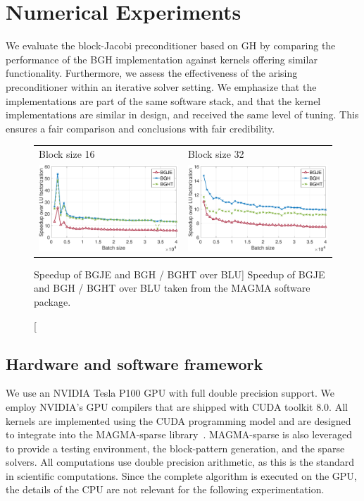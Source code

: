 \section{Numerical Experiments}
We evaluate the block-Jacobi preconditioner based on GH 
by comparing the performance of the BGH implementation 
against kernels offering similar functionality.
Furthermore, we assess the effectiveness of the arising preconditioner within an iterative solver setting.
We emphasize that the implementations are part of the same software stack,
and that the kernel implementations are similar in design, and received the same level of tuning. 
This ensures a fair comparison and conclusions with fair credibility. 

\begin{figure}[t]
\begin{center}
\begin{tabular}{ll}
Block size 16 & Block size 32\\
\includegraphics[width=.45\columnwidth]{plots/dgebjp_setup_P100_lu_gje_gh_16_speedup.pdf}
&
\includegraphics[width=.45\columnwidth]{plots/dgebjp_setup_P100_lu_gje_gh_32_speedup.pdf}
\end{tabular}
\end{center}
\caption
[Speedup of BGJE and BGH / BGHT over BLU]
{
Speedup of BGJE and BGH / BGHT over BLU taken from the MAGMA software package.
}
\label{2017-gh-block-jacobi:fig:bgjeperformance}
\end{figure}


\subsection{Hardware and software framework}
We use an NVIDIA Tesla P100 GPU with full double precision support.
We employ NVIDIA's GPU compilers that are shipped with CUDA toolkit 8.0. 
All kernels are implemented using the CUDA programming model and are designed to integrate into the MAGMA-sparse library~\cite{magma}.
MAGMA-sparse is also leveraged to provide a testing environment, the block-pattern generation, and the sparse solvers.
All computations use double precision arithmetic, as this is the standard in scientific computations.
Since the complete algorithm is executed on the GPU, the details of the CPU are not relevant for the following experimentation. 



